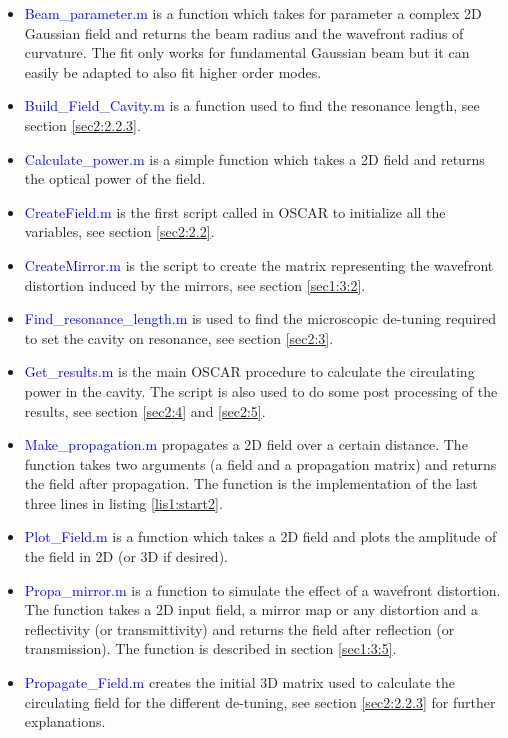 \begin{itemize}
  \item \textcolor{blue}{Beam\_parameter.m} is a function which takes for parameter a complex 2D Gaussian field and returns the beam radius and the wavefront radius of curvature. The fit only works for fundamental Gaussian beam but it can easily be adapted to also fit higher order modes.
  \item \textcolor{blue}{Build\_Field\_Cavity.m} is a function used to find the resonance length, see section \ref{sec2:2.2.3}.
  \item \textcolor{blue}{Calculate\_power.m} is a simple function which takes a 2D field and returns the optical power of the field.
  \item \textcolor{blue}{CreateField.m} is the first script called in OSCAR to initialize all the variables, see section \ref{sec2:2.2}.
  \item \textcolor{blue}{CreateMirror.m} is the script to create the matrix representing the wavefront distortion induced by the mirrors, see section \ref{sec1:3:2}.
  \item \textcolor{blue}{Find\_resonance\_length.m} is used to find the microscopic de-tuning required to set the cavity on resonance, see section \ref{sec2:3}.
  \item \textcolor{blue}{Get\_results.m} is the main OSCAR procedure to calculate the circulating power in the cavity. The script is also used to do some post processing of the results, see section \ref{sec2:4} and \ref{sec2:5}.
  \item \textcolor{blue}{Make\_propagation.m} propagates a 2D field over a certain distance. The function takes two arguments (a field and a propagation matrix) and returns the field after propagation. The function is the implementation of the last three lines in listing \ref{lis1:start2}.
  \item \textcolor{blue}{Plot\_Field.m} is a function which takes a 2D field and plots the amplitude of the field in 2D (or 3D if desired).
  \item \textcolor{blue}{Propa\_mirror.m} is a function to simulate the effect of a wavefront distortion. The function takes a 2D input field, a mirror map or any distortion and a reflectivity (or transmittivity) and returns the field after reflection (or transmission). The function is described in section \ref{sec1:3:5}.
  \item \textcolor{blue}{Propagate\_Field.m} creates the initial 3D matrix used to calculate the circulating field for the different de-tuning, see section \ref{sec2:2.2.3} for further explanations.
\end{itemize}



